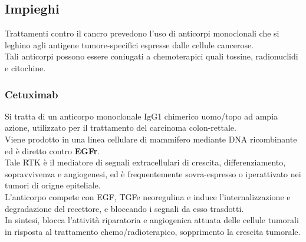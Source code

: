 \documentclass[a4paper, 12pt]{article}
\begin{document}
\subsection{Impieghi}
Trattamenti contro il cancro prevedono l'uso di anticorpi monoclonali che si leghino agli antigene tumore-specifici espresse dalle cellule cancerose.\\
Tali anticorpi possono essere coniugati a chemoterapici quali tossine, radionuclidi e citochine.
\subsubsection{Cetuximab}
Si tratta di un anticorpo monoclonale IgG1 chimerico uomo/topo ad ampia azione, utilizzato per il trattamento del carcinoma colon-rettale.\\
Viene prodotto in una linea cellulare di mammifero mediante DNA ricombinante ed è diretto contro \textbf{EGFr}.\\
Tale RTK è il mediatore di segnali extracellulari di crescita, differenziamento, sopravvivenza e angiogenesi, ed è frequentemente sovra-espresso o iperattivato nei tumori di origne epiteliale.\\
L'anticorpo compete con EGF, TGF\textalpha e neoregulina e induce l'internalizzazione e degradazione del recettore, e bloccando i segnali da esso trasdotti.\\
In sintesi, blocca l'attività riparatoria e angiogenica attuata delle cellule tumorali in risposta al trattamento chemo/radioterapico, sopprimento la crescita tumorale.
\end{document}
